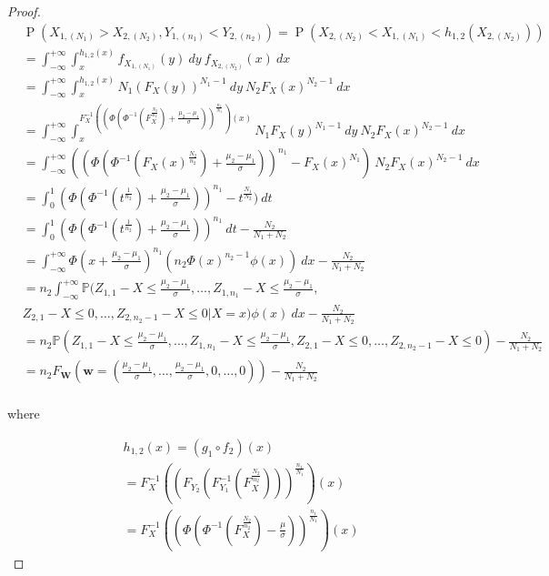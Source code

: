 \documentclass[12pt]{article}
\DeclareMathOperator*{\Prob}{P}
\begin{document}
\begin{proof}
\begin{align*}
  &\Prob\left(X_{1,(N_1)} > X_{2,(N_2)}, Y_{1,(n_1)} < Y_{2,(n_2)}\right) = \Prob\left( X_{2,(N_2)} < X_{1,(N_1)}  < h_{1,2}\left(X_{2,(N_2)}\right)\right) \\
  &= \int_{-\infty}^{+\infty}\int_{x}^{h_{1,2}(x)} f_{X_{1,(N_1)}}(y)\ dy \ f_{X_{2,(N_2)}}(x) \ dx \\
  &= \int_{-\infty}^{+\infty}\int_{x}^{h_{1,2}(x)} N_1 (F_X(y))^{N_1-1}\ dy \ N_2 F_X(x)^{N_2-1}\ dx \\
  &= \int_{-\infty}^{+\infty}\int_{x}^{F_X^{-1}((\Phi(\Phi^{-1}(F_X^{\frac{N_2}{n_2}})+\frac{\mu_2 - \mu_1}{\sigma}))^{\frac{n_1}{N_1}})(x)} N_1 F_X(y)^{N_1-1}\ dy \ N_2 F_X(x)^{N_2-1} \ dx \\
 &= \int_{-\infty}^{+\infty} ((\Phi(\Phi^{-1}(F_X(x)^{\frac{N_2}{n_2}})+\frac{\mu_2 - \mu_1}{\sigma}))^{n_1} - F_X(x)^{N_1}) \ N_2 F_X(x)^{N_2-1}\ dx \\
 & = \int_{0}^{1}(\Phi(\Phi^{-1}(t^{\frac{1}{n_2}})+\frac{\mu_2 - \mu_1}{\sigma}))^{n_1} - t^{\frac{N_1}{N_2}}) \ dt \\
  &= \int_{0}^{1}(\Phi(\Phi^{-1}(t^{\frac{1}{n_2}})+\frac{\mu_2 - \mu_1}{\sigma}))^{n_1} \ dt - \frac{N_2}{N_1 + N_2} \\
  &= \int_{-\infty}^{+\infty} \Phi(x+\frac{\mu_2 - \mu_1}{\sigma})^{n_1} (n_2\Phi(x)^{n_2-1}\phi(x))\ dx - \frac{N_2}{N_1 + N_2} \\
  &= n_2 \int_{-\infty}^{+\infty}\mathbb{P}(Z_{1,1} -X \leq \frac{\mu_2 - \mu_1}{\sigma}, \dots, Z_{1,n_1} -X \leq \frac{\mu_2 - \mu_1}{\sigma}, \\
  &Z_{2,1} -X \leq 0, \dots,  Z_{2,{n_2-1}} -X \leq 0| X = x) \phi(x)\ dx - \frac{N_2}{N_1 + N_2}\\
  &= n_2\mathbb{P}(Z_{1,1} -X \leq \frac{\mu_2 - \mu_1}{\sigma}, \dots, Z_{1,n_1}-X \leq \frac{\mu_2 - \mu_1}{\sigma}, Z_{2,1} -X\leq 0, \dots,  Z_{2,{n_2-1}} -X \leq 0) - \frac{N_2}{N_1 + N_2}\\
  &= n_2F_{\mathbf{W}}(\mathbf{w} = (\frac{\mu_2 - \mu_1}{\sigma}, \dots, \frac{\mu_2 - \mu_1}{\sigma}, 0, \dots, 0)) - \frac{N_2}{N_1 + N_2} \\
 \end{align*}
  
where

\begin{align*}
	&h_{1,2}(x) = (g_1 \circ f_2)(x) \\
	&= F_X^{-1}((F_{Y_2}(F_{Y_1}^{-1}(F_X^{\frac{N_2}{n_2}})))^{\frac{n_1}{N_1}})(x)\\
	&= F_X^{-1}((\Phi(\Phi^{-1}(F_X^{\frac{N_2}{n_2}})-\frac{\mu}{\sigma}))^{\frac{n_1}{N_1}})(x)
	\end{align*}


\end{proof}
\end{document}

